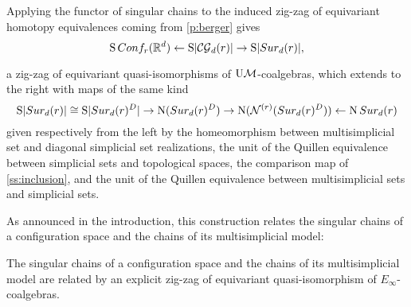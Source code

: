 Applying the functor of singular chains to the induced zig-zag of equivariant homotopy equivalences coming from \cref{p:berger} gives
\[
\operatorname{S}Conf_{r}(\mathbb{R}^{d}) \leftarrow
\operatorname{S}\lvert\mathcal{CG}_{d}(r)\rvert \to
\operatorname{S}\lvert Sur_{d}(r)\rvert,
\]

a zig-zag of equivariant quasi-isomorphisms of $\mathrm{U}\mathcal{M}$-coalgebras, which extends to the right with maps of the same kind
\[
\operatorname{S}\lvert Sur_{d}(r)\rvert \cong
\operatorname{S} \lvert Sur_{d}(r)^{D}\rvert \to
\operatorname{N}(Sur_{d}(r)^D) \to
\operatorname{N}(\mathcal{N}^{(r)}(Sur_{d}(r)^D)) \leftarrow
\operatorname{N}Sur_{d}(r)
\]
given respectively from the left by the homeomorphism between multisimplicial set and diagonal simplicial set realizations, the unit of the Quillen equivalence between simplicial sets and topological spaces, the comparison map of \cref{ss:inclusion}, and the unit of the Quillen equivalence between multisimplicial sets and simplicial sets.

As announced in the introduction, this construction relates the singular chains of a configuration space and the chains of its multisimplicial model:
\begin{theorem}
	The singular chains of a configuration space and the chains of its multisimplicial model are related by an explicit zig-zag of equivariant quasi-isomorphism of $E_\infty$-coalgebras.
\end{theorem}
